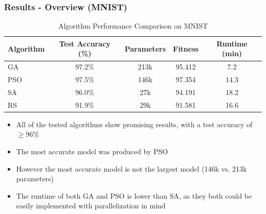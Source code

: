 \documentclass{beamer}
\begin{document}
    \begin{frame}
        \frametitle{Results - Overview (MNIST)}
        \begin{table}[htbp]
            \centering
            \begin{tabular}{|l|c|c|c|c|}
            \hline
            Algorithm & Test Accuracy (\%) & Parameters & Fitness & Runtime (min) \\
            \hline
            GA & 97.2\% & 213k & 95.412 & 7.2 \\
            PSO & 97.5\% & 146k & 97.354 & 14.3 \\
            SA & 96.0\% & 27k & 94.191 & 18.2 \\
            RS & 91.9\% & 29k & 91.581 & 16.6 \\
            \hline
            \end{tabular}
            \caption{Algorithm Performance Comparison on MNIST}
            \label{tab:results}
        \end{table}
        \begin{itemize}
            \item All of the tested algorithms show promising results, with a test accuracy of $\geq 96\%$
            \item The most accurate model was produced by PSO
            \item However the most accurate model is not the largest model (146k vs. 213k parameters)
            \item The runtime of both GA and PSO is lower than SA, as they both could be easily implemented with parallelization in mind
        \end{itemize}
    \end{frame}
\end{document}
